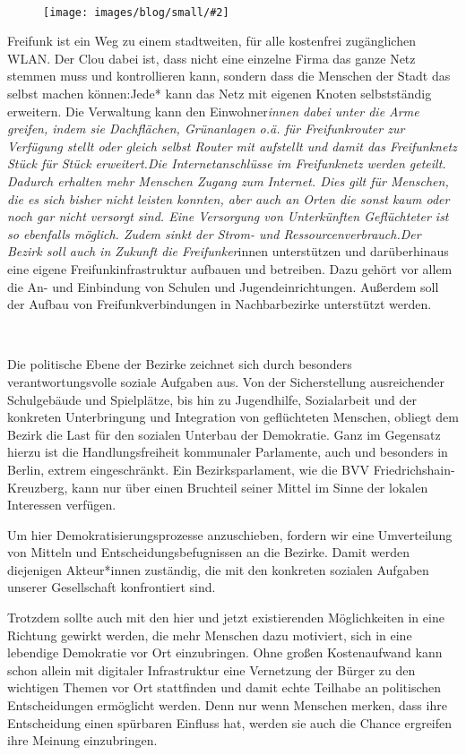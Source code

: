 \documentclass[a4paper,10pt]{article}
\newcommand{\mysection}[1]{{\vspace{1cm}\noindent\color{gray}{\ttfamily\LARGE\raggedright #1}\\\medskip}}
\newcommand{\abschnitt}[2]{%
\mysection{\raggedright #1}%
\begin{figure}[t]%
\vspace*{-2.7cm}%
\hspace*{-2.1cm}%
\texttt{[image: images/blog/small/\#2]} %
\end{figure}%
}
\begin{document}
\clearpage
\abschnitt{Freifunk}{routerallerlaender.jpg}

Freifunk ist ein Weg zu einem stadtweiten, für alle kostenfrei
zugänglichen WLAN. Der Clou dabei ist, dass nicht eine einzelne Firma
das ganze Netz stemmen muss und kontrollieren kann, sondern dass die
Menschen der Stadt das selbst machen können:Jede* kann das Netz mit
eigenen Knoten selbstständig erweitern. Die Verwaltung kann den
Einwohner\emph{innen dabei unter die Arme greifen, indem sie
Dachflächen, Grünanlagen o.ä. für Freifunkrouter zur Verfügung stellt
oder gleich selbst Router mit aufstellt und damit das Freifunknetz Stück
für Stück erweitert.Die Internetanschlüsse im Freifunknetz werden
geteilt. Dadurch erhalten mehr Menschen Zugang zum Internet. Dies gilt
für Menschen, die es sich bisher nicht leisten konnten, aber auch an
Orten die sonst kaum oder noch gar nicht versorgt sind. Eine Versorgung
von Unterkünften Geflüchteter ist so ebenfalls möglich. Zudem sinkt der
Strom- und Ressourcenverbrauch.Der Bezirk soll auch in Zukunft die
Freifunker}innen unterstützen und darüberhinaus eine eigene
Freifunkinfrastruktur aufbauen und betreiben. Dazu gehört vor allem die
An- und Einbindung von Schulen und Jugendeinrichtungen. Außerdem soll
der Aufbau von Freifunkverbindungen in Nachbarbezirke unterstützt
werden.

\mysection{Soziales}

Die politische Ebene der Bezirke zeichnet sich durch besonders
verantwortungsvolle soziale Aufgaben aus. Von der Sicherstellung
ausreichender Schulgebäude und Spielplätze, bis hin zu Jugendhilfe,
Sozialarbeit und der konkreten Unterbringung und Integration von
geflüchteten Menschen, obliegt dem Bezirk die Last für den sozialen
Unterbau der Demokratie. Ganz im Gegensatz hierzu ist die
Handlungsfreiheit kommunaler Parlamente, auch und besonders in Berlin,
extrem eingeschränkt. Ein Bezirksparlament, wie die BVV
Friedrichshain-Kreuzberg, kann nur über einen Bruchteil seiner Mittel im
Sinne der lokalen Interessen verfügen.

Um hier Demokratisierungsprozesse anzuschieben, fordern wir eine
Umverteilung von Mitteln und Entscheidungsbefugnissen an die Bezirke.
Damit werden diejenigen Akteur*innen zuständig, die mit den konkreten
sozialen Aufgaben unserer Gesellschaft konfrontiert sind.

Trotzdem sollte auch mit den hier und jetzt existierenden Möglichkeiten
in eine Richtung gewirkt werden, die mehr Menschen dazu motiviert, sich
in eine lebendige Demokratie vor Ort einzubringen. Ohne großen
Kostenaufwand kann schon allein mit digitaler Infrastruktur eine
Vernetzung der Bürger zu den wichtigen Themen vor Ort stattfinden und
damit echte Teilhabe an politischen Entscheidungen ermöglicht werden.
Denn nur wenn Menschen merken, dass ihre Entscheidung einen spürbaren
Einfluss hat, werden sie auch die Chance ergreifen ihre Meinung
einzubringen.
\end{document}
